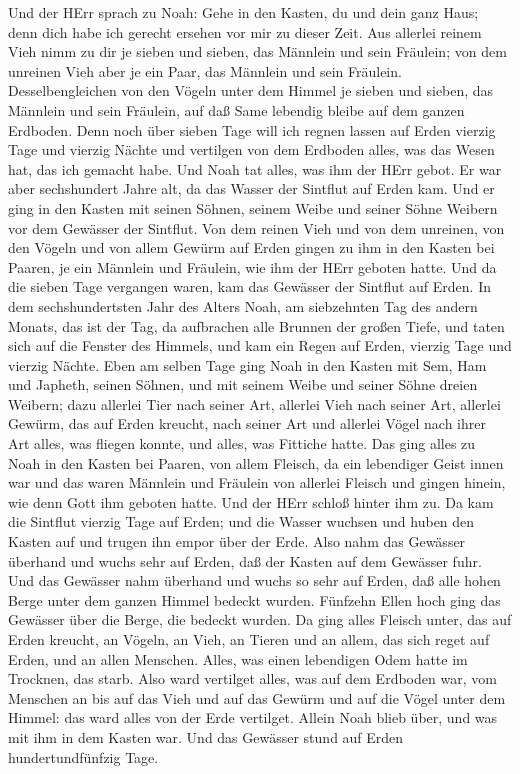 Und der HErr sprach zu Noah: Gehe in den Kasten, du und
dein ganz Haus; denn dich habe ich gerecht ersehen vor mir zu dieser
Zeit.  Aus allerlei reinem Vieh nimm zu dir je sieben und
sieben, das Männlein und sein Fräulein; von dem unreinen Vieh aber je
ein Paar, das Männlein und sein Fräulein.  Desselbengleichen
von den Vögeln unter dem Himmel je sieben und sieben, das Männlein und
sein Fräulein, auf daß Same lebendig bleibe auf dem ganzen Erdboden.
 Denn noch über sieben Tage will ich regnen lassen auf Erden
vierzig Tage und vierzig Nächte und vertilgen von dem Erdboden alles,
was das Wesen hat, das ich gemacht habe.  Und Noah tat
alles, was ihm der HErr gebot.  Er war aber sechshundert
Jahre alt, da das Wasser der Sintflut auf Erden kam.  Und er
ging in den Kasten mit seinen Söhnen, seinem Weibe und seiner Söhne
Weibern vor dem Gewässer der Sintflut.  Von dem reinen Vieh
und von dem unreinen, von den Vögeln und von allem Gewürm auf Erden
 gingen zu ihm in den Kasten bei Paaren, je ein Männlein und
Fräulein, wie ihm der HErr geboten hatte.  Und da die
sieben Tage vergangen waren, kam das Gewässer der Sintflut auf Erden.
 In dem sechshundertsten Jahr des Alters Noah, am
siebzehnten Tag des andern Monats, das ist der Tag, da aufbrachen alle
Brunnen der großen Tiefe, und taten sich auf die Fenster des Himmels,
 und kam ein Regen auf Erden, vierzig Tage und vierzig
Nächte.  Eben am selben Tage ging Noah in den Kasten mit
Sem, Ham und Japheth, seinen Söhnen, und mit seinem Weibe und seiner
Söhne dreien Weibern;  dazu allerlei Tier nach seiner Art,
allerlei Vieh nach seiner Art, allerlei Gewürm, das auf Erden kreucht,
nach seiner Art und allerlei Vögel nach ihrer Art alles, was fliegen
konnte, und alles, was Fittiche hatte.  Das ging alles zu
Noah in den Kasten bei Paaren, von allem Fleisch, da ein lebendiger
Geist innen war  und das waren Männlein und Fräulein von
allerlei Fleisch und gingen hinein, wie denn Gott ihm geboten hatte. Und
der HErr schloß hinter ihm zu.  Da kam die Sintflut vierzig
Tage auf Erden; und die Wasser wuchsen und huben den Kasten auf und
trugen ihn empor über der Erde.  Also nahm das Gewässer
überhand und wuchs sehr auf Erden, daß der Kasten auf dem Gewässer fuhr.
 Und das Gewässer nahm überhand und wuchs so sehr auf
Erden, daß alle hohen Berge unter dem ganzen Himmel bedeckt wurden.
 Fünfzehn Ellen hoch ging das Gewässer über die Berge, die
bedeckt wurden.  Da ging alles Fleisch unter, das auf Erden
kreucht, an Vögeln, an Vieh, an Tieren und an allem, das sich reget auf
Erden, und an allen Menschen.  Alles, was einen lebendigen
Odem hatte im Trocknen, das starb.  Also ward vertilget
alles, was auf dem Erdboden war, vom Menschen an bis auf das Vieh und
auf das Gewürm und auf die Vögel unter dem Himmel: das ward alles von
der Erde vertilget. Allein Noah blieb über, und was mit ihm in dem
Kasten war.  Und das Gewässer stund auf Erden
hundertundfünfzig Tage.


